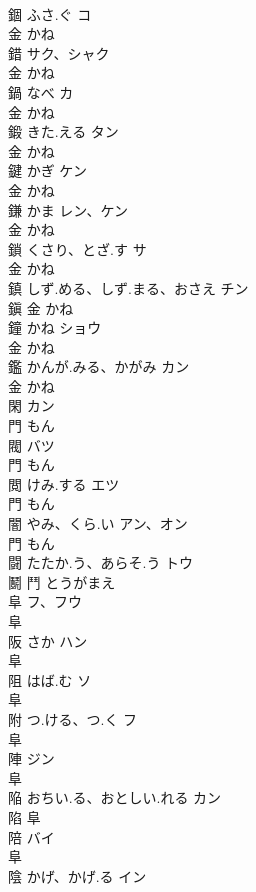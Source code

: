 \documentclass[8pt]{extreport}
\begin{document}
\begin{CJK}{UTF8}{min}
\\	錮	ふさ.ぐ	コ	
\\	金		かね		
\\	錯		サク、シャク	
\\	金		かね		
\\	鍋	なべ	カ	
\\	金		かね		
\\	鍛	きた.える	タン	
\\	金		かね		
\\	鍵	かぎ	ケン	
\\	金		かね		
\\	鎌	かま	レン、ケン	
\\	金		かね		
\\	鎖	くさり、とざ.す	サ	
\\	金		かね		
\\	鎮	しず.める、しず.まる、おさえ	チン	
\\	鎭	金		かね		
\\	鐘	かね	ショウ	
\\	金		かね		
\\	鑑	かんが.みる、かがみ	カン	
\\	金		かね		
\\	閑		カン	
\\	門		もん		
\\	閥		バツ	
\\	門		もん		
\\	閲	けみ.する	エツ	
\\	門		もん		
\\	闇	やみ、くら.い	アン、オン	
\\	門		もん		
\\	闘	たたか.う、あらそ.う	トウ	
\\	鬭	鬥		とうがまえ		
\\	阜		フ、フウ	
\\	阜				
\\	阪	さか	ハン	
\\	阜				
\\	阻	はば.む	ソ	
\\	阜				
\\	附	つ.ける、つ.く	フ	
\\	阜				
\\	陣		ジン	
\\	阜				
\\	陥	おちい.る、おとしい.れる	カン	
\\	陷	阜				
\\	陪		バイ	
\\	阜				
\\	陰	かげ、かげ.る	イン	

\end{CJK}
\end{document}
